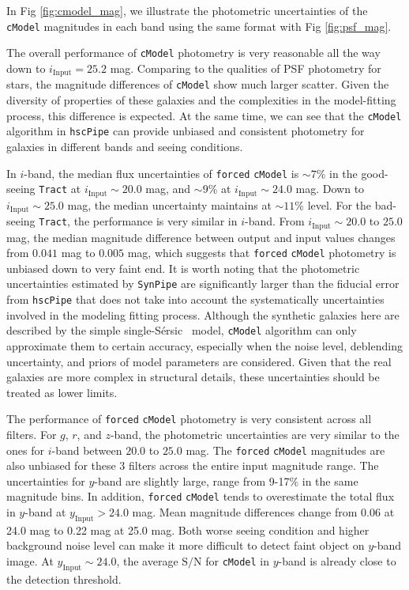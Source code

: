 \documentclass[useamsfonts]{pasj01}
\def\ser{{S\'{e}rsic\ }}
\def\hscpipe{\texttt{hscPipe}}
\def\synpipe{\texttt{SynPipe}}
\def\cmodel{\texttt{cModel}}
\def\forced{\texttt{forced}}
\def\tract{\texttt{Tract}}
\def\s2n{{$\mathrm{S}/\mathrm{N}$}}
\newcommand{\plus}{\raisebox{.4\height}{\scalebox{.6}{+}}}
\newcommand{\minus}{\raisebox{.4\height}{\scalebox{.8}{-}}}
\begin{document}
    In Fig \ref{fig:cmodel_mag}, we illustrate the photometric uncertainties of the 
    \cmodel{} magnitudes in each band using the same format with 
    Fig \ref{fig:psf_mag}.
    
    The overall performance of \cmodel{} photometry is very reasonable all the way 
    down to $i_{\mathrm{Input}}=25.2$ mag. 
    Comparing to the qualities of PSF photometry for stars, the magnitude differences
    of \cmodel{} show much larger scatter. 
    Given the diversity of properties of these galaxies and the complexities in the 
    model-fitting process, this difference is expected.  
    At the same time, we can see that the \cmodel{} algorithm in \hscpipe{} can 
    provide unbiased and consistent photometry for galaxies in different bands and 
    seeing conditions. 
    
    In $i$-band, the median flux uncertainties of \forced{} \cmodel{} is ${\sim}7$\% 
    in the good-seeing \tract{} at $i_{\mathrm{Input}}{\sim}20.0$ mag, 
    and ${\sim}9$\% at $i_{\mathrm{Input}}{\sim}24.0$ mag.  
    Down to $i_{\mathrm{Input}}{\sim}25.0$ mag, the median uncertainty maintains 
    at ${\sim}11$\% level. 
    For the bad-seeing \tract{}, the performance is very similar in $i$-band. 
    From $i_{\mathrm{Input}}{\sim}20.0$ to $25.0$ mag, the median magnitude difference
    between output and input values changes from \plus{}$0.041$ mag to 
    \minus{}$0.005$ mag, which suggests that \forced{} \cmodel{} photometry is 
    unbiased down to very faint end. 
    It is worth noting that the photometric uncertainties estimated by \synpipe{}
    are significantly larger than the fiducial error from \hscpipe{} that does not 
    take into account the systematically uncertainties involved in the modeling 
    fitting process. 
    Although the synthetic galaxies here are described by the simple single-\ser{} 
    model, \cmodel{} algorithm can only approximate them to certain accuracy, 
    especially when the noise level, deblending uncertainty, and priors of model 
    parameters are considered. 
    Given that the real galaxies are more complex in structural details, these 
    uncertainties should be treated as lower limits. 
    
    The performance of \forced{} \cmodel{} photometry is very consistent across all
    filters. 
    For $g$, $r$, and $z$-band, the photometric uncertainties are very similar to 
    the ones for $i$-band between $20.0$ to $25.0$ mag. 
    The \forced{} \cmodel{} magnitudes are also unbiased for these 3 filters 
    across the entire input magnitude range. 
    The uncertainties for $y$-band are slightly large, range from 9-17\% in the 
    same magnitude bins. 
    In addition, \forced{} \cmodel{} tends to overestimate the total flux in $y$-band
    at $y_{\mathrm{Input}}>24.0$ mag. 
    Mean magnitude differences change from \minus{}0.06 at 24.0 mag to \minus{}0.22
    mag at 25.0 mag.  
    Both worse seeing condition and higher background noise level can make it more 
    difficult to detect faint object on $y$-band image.
    At $y_{\mathrm{Input}}{\sim}24.0$, the average \s2n{} for \cmodel{} in $y$-band
    is already close to the detection threshold. 
    
\end{document}
